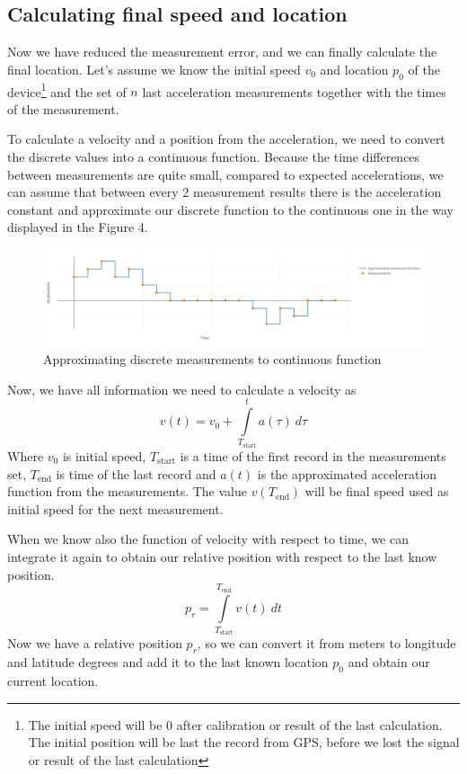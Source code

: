 \documentclass[hidelinks,a4paper]{article}
\begin{document}
\subsection{Calculating final speed and location}
Now we have reduced the measurement error, and we can finally calculate the final location. Let's assume we know the initial speed $v_0$ and location $p_0$ of the device\footnote{The initial speed will be 0 after calibration or result of the last calculation. The initial position will be last the record from GPS, before we lost the signal or result of the last calculation} and the set of $n$ last acceleration measurements together with the times of the measurement.\par
To calculate a velocity and a position from the acceleration, we need to convert the discrete values into a continuous function. Because the time differences between measurements are quite small, compared to expected accelerations, we can assume that between every 2 measurement results there is the acceleration constant and approximate our discrete function to the continuous one in the way displayed in the Figure 4.\par
\begin{figure}[h]
    \includegraphics[width=15cm]{img/DiscToCont.png}
    \caption{Approximating discrete measurements to continuous function}
\end{figure}
Now, we have all information we need to calculate a velocity as
$$
    v(t) = v_0 + \int\limits_{T_\text{start}}^{t} a(\tau)~d\tau
$$
Where $v_0$ is initial speed, $T_\text{start}$ is a time of the first record in the measurements set, $T_\text{end}$ is time of the last record and $a(t)$ is the approximated acceleration function from the measurements. The value $v(T_\text{end})$ will be final speed used as initial speed for the next measurement.\par
When we know also the function of velocity with respect to time, we can integrate it again to obtain our relative position with respect to the last know position.
$$
    p_r = \int\limits_{T_\text{start}}^{T_\text{end}} v(t)~dt
$$
Now we have a relative position $p_r$, so we can convert it from meters to longitude and latitude degrees and add it to the last known location $p_0$ and obtain our current location.\par
\end{document}
